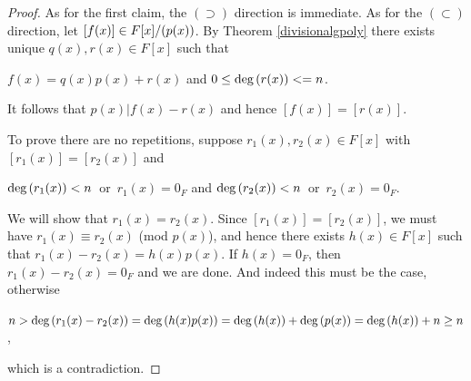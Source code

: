 \documentclass[11pt,fleqn,dvipsnames,usenames]{article}
\newcommand{\p}{\noindent}
\begin{document}
\begin{proof}
As for the first claim, the $(\supset)$ direction is immediate.  As for the $(\subset)$ direction, let $[f(x)]\in\nolinebreak F[x]/(p(x))$.  By Theorem \ref{divisionalgpoly} there exists unique $q(x), r(x)\in F[x]$ such that
\begin{center}
$f(x) = q(x)p(x) + r(x)$ and $0\leq \text{deg}\left(r(x)\right) < = n$.
\end{center}
\p It follows that $p(x)|f(x) - r(x)$ and hence $[f(x)] = [r(x)]$.
\vsp

\p To prove there are no repetitions, suppose $r_{1}(x), r_{2}(x)\in F[x]$ with $[r_{1}(x)] = [r_{2}(x)]$ and 
\begin{center}
$\text{deg}\left(r_{1}(x)\right) < n$\  or\  $r_{1}(x) = 0_{F}$\hspace{1cm} and \hspace{1cm} $\text{deg}\left(r_{2}(x)\right) < n$\  or\  $r_{2}(x) = 0_{F}$.
\end{center}

\p We will show that $r_{1}(x) = r_{2}(x)$.  Since $[r_{1}(x)] = [r_{2}(x)]$, we must have $r_{1}(x)\equiv r_{2}(x)$ (mod $p(x)$), and hence there exists $h(x)\in F[x]$ such that $r_{1}(x) - r_{2}(x) = h(x)p(x)$.  If $h(x) = 0_{F}$, then $r_{1}(x) - r_{2}(x) = 0_{F}$ and we are done.  And indeed this must be the case, otherwise
\begin{center}
$n > \text{deg}\left(r_{1}(x) - r_{2}(x)\right) = \text{deg}\left(h(x)p(x)\right) = \text{deg}\left(h(x)\right) + \text{deg}\left(p(x)\right) = \text{deg}\left(h(x)\right) + n \geq n$,
\end{center}
which is a contradiction.
\end{proof}
%
\end{document}
